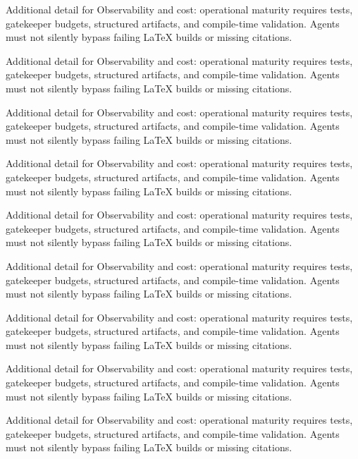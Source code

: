 Additional detail for Observability and cost: operational maturity requires tests, gatekeeper budgets, structured artifacts, and compile-time validation. Agents must not silently bypass failing LaTeX builds or missing citations. \cite{crewai2024} \cite{langgraph2024} \cite{mcp2024}

Additional detail for Observability and cost: operational maturity requires tests, gatekeeper budgets, structured artifacts, and compile-time validation. Agents must not silently bypass failing LaTeX builds or missing citations. \cite{crewai2024} \cite{langgraph2024} \cite{mcp2024}

Additional detail for Observability and cost: operational maturity requires tests, gatekeeper budgets, structured artifacts, and compile-time validation. Agents must not silently bypass failing LaTeX builds or missing citations. \cite{crewai2024} \cite{langgraph2024} \cite{mcp2024}

Additional detail for Observability and cost: operational maturity requires tests, gatekeeper budgets, structured artifacts, and compile-time validation. Agents must not silently bypass failing LaTeX builds or missing citations. \cite{crewai2024} \cite{langgraph2024} \cite{mcp2024}

Additional detail for Observability and cost: operational maturity requires tests, gatekeeper budgets, structured artifacts, and compile-time validation. Agents must not silently bypass failing LaTeX builds or missing citations. \cite{crewai2024} \cite{langgraph2024} \cite{mcp2024}

Additional detail for Observability and cost: operational maturity requires tests, gatekeeper budgets, structured artifacts, and compile-time validation. Agents must not silently bypass failing LaTeX builds or missing citations. \cite{crewai2024} \cite{langgraph2024} \cite{mcp2024}

Additional detail for Observability and cost: operational maturity requires tests, gatekeeper budgets, structured artifacts, and compile-time validation. Agents must not silently bypass failing LaTeX builds or missing citations. \cite{crewai2024} \cite{langgraph2024} \cite{mcp2024}

Additional detail for Observability and cost: operational maturity requires tests, gatekeeper budgets, structured artifacts, and compile-time validation. Agents must not silently bypass failing LaTeX builds or missing citations. \cite{crewai2024} \cite{langgraph2024} \cite{mcp2024}

Additional detail for Observability and cost: operational maturity requires tests, gatekeeper budgets, structured artifacts, and compile-time validation. Agents must not silently bypass failing LaTeX builds or missing citations. \cite{crewai2024} \cite{langgraph2024} \cite{mcp2024}

